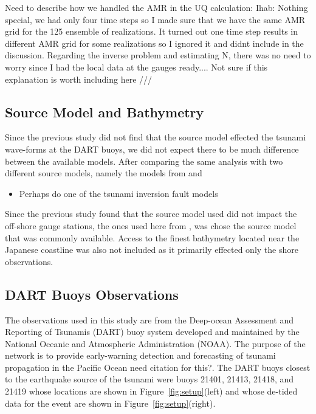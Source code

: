 \alert{Need to describe how we handled the AMR in the UQ calculation: Ihab: Nothing special, we had only four time
steps so I made sure that we have the same AMR grid for the 125 ensemble of realizations. It turned out
one time step results in different AMR grid for some realizations so I ignored it and didnt include in the discussion.
Regarding the inverse problem and estimating N, there was no need to worry since I had the local data
at the gauges ready.... Not sure if this explanation is worth including here ///}


\subsection{Source Model and Bathymetry}

Since the previous study \cite{MacInnes:2013cr} did not find that the source model effected the tsunami wave-forms at the DART buoys, we did not expect there to be much difference between the available models.  After comparing the same analysis with two different source models, namely the models from \cite{Ammon:2011dm} and

\begin{itemize}
    \item Perhaps do one of the tsunami inversion fault models
\end{itemize}

Since the previous study found that the source model used did not impact the off-shore gauge stations, the ones used here from \cite{Ammon:2011dm}, was chose the source model that was commonly available.  Access to the finest bathymetry located near the Japanese coastline was also not included as it primarily effected only the shore observations.

\subsection{DART Buoys Observations}

The observations used in this study are from the Deep-ocean Assessment and Reporting of Tsunamis (DART) buoy system developed and maintained by the National Oceanic and Atmospheric Administration (NOAA).  The purpose of the network is to provide early-warning detection and forecasting of tsunami propagation in the Pacific Ocean \alert{need citation for this?}.  The DART buoys closest to the earthquake source of the \tohoku tsunami were buoys 21401, 21413, 21418, and 21419 whose locations are shown in Figure~\ref{fig:setup}(left) and whose de-tided data for the event are shown in Figure~\ref{fig:setup}(right).
